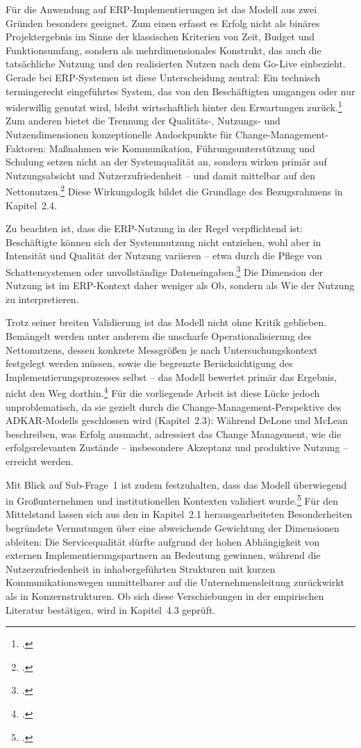F\"ur die Anwendung auf ERP-Implementierungen ist das Modell aus zwei Gr\"unden besonders geeignet. Zum einen erfasst es Erfolg nicht als bin\"ares Projektergebnis im Sinne der klassischen Kriterien von Zeit, Budget und Funktionsumfang, sondern als mehrdimensionales Konstrukt, das auch die tats\"achliche Nutzung und den realisierten Nutzen nach dem Go-Live einbezieht. Gerade bei ERP-Systemen ist diese Unterscheidung zentral: Ein technisch termingerecht eingef\"uhrtes System, das von den Besch\"aftigten umgangen oder nur widerwillig genutzt wird, bleibt wirtschaftlich hinter den Erwartungen zur\"uck.\footcite[Vgl.][S.~184--186]{markus2000} Zum anderen bietet die Trennung der Qualit\"ats-, Nutzungs- und Nutzendimensionen konzeptionelle Andockpunkte f\"ur Change-Management-Faktoren: Ma\ss{}nahmen wie Kommunikation, F\"uhrungsunterst\"utzung und Schulung setzen nicht an der Systemqualit\"at an, sondern wirken prim\"ar auf Nutzungsabsicht und Nutzerzufriedenheit -- und damit mittelbar auf den Nettonutzen.\footcite[Vgl.][S.~266--275]{aladwani2001} Diese Wirkungslogik bildet die Grundlage des Bezugsrahmens in Kapitel~2.4.

Zu beachten ist, dass die ERP-Nutzung in der Regel verpflichtend ist: Besch\"aftigte k\"onnen sich der Systemnutzung nicht entziehen, wohl aber in Intensit\"at und Qualit\"at der Nutzung variieren -- etwa durch die Pflege von Schattensystemen oder unvollst\"andige Dateneingaben.\footcite[Vgl.][S.~240--242]{petter2008} Die Dimension der Nutzung ist im ERP-Kontext daher weniger als Ob, sondern als Wie der Nutzung zu interpretieren.

Trotz seiner breiten Validierung ist das Modell nicht ohne Kritik geblieben. Bem\"angelt werden unter anderem die unscharfe Operationalisierung des Nettonutzens, dessen konkrete Messgr\"o\ss{}en je nach Untersuchungskontext festgelegt werden m\"ussen, sowie die begrenzte Ber\"ucksichtigung des Implementierungsprozesses selbst -- das Modell bewertet prim\"ar das Ergebnis, nicht den Weg dorthin.\footcite[Vgl.][S.~4--7]{urbach2012} F\"ur die vorliegende Arbeit ist diese L\"ucke jedoch unproblematisch, da sie gezielt durch die Change-Management-Perspektive des ADKAR-Modells geschlossen wird (Kapitel~2.3): W\"ahrend DeLone und McLean beschreiben, was Erfolg ausmacht, adressiert das Change Management, wie die erfolgsrelevanten Zust\"ande -- insbesondere Akzeptanz und produktive Nutzung -- erreicht werden.

Mit Blick auf Sub-Frage~1 ist zudem festzuhalten, dass das Modell \"uberwiegend in Gro\ss{}unternehmen und institutionellen Kontexten validiert wurde.\footcite[Vgl.][S.~254--256]{petter2008} F\"ur den Mittelstand lassen sich aus den in Kapitel~2.1 herausgearbeiteten Besonderheiten begr\"undete Vermutungen \"uber eine abweichende Gewichtung der Dimensionen ableiten: Die Servicequalit\"at d\"urfte aufgrund der hohen Abh\"angigkeit von externen Implementierungspartnern an Bedeutung gewinnen, w\"ahrend die Nutzerzufriedenheit in inhabergef\"uhrten Strukturen mit kurzen Kommunikationswegen unmittelbarer auf die Unternehmensleitung zur\"uckwirkt als in Konzernstrukturen. Ob sich diese Verschiebungen in der empirischen Literatur best\"atigen, wird in Kapitel~4.3 gepr\"uft.

